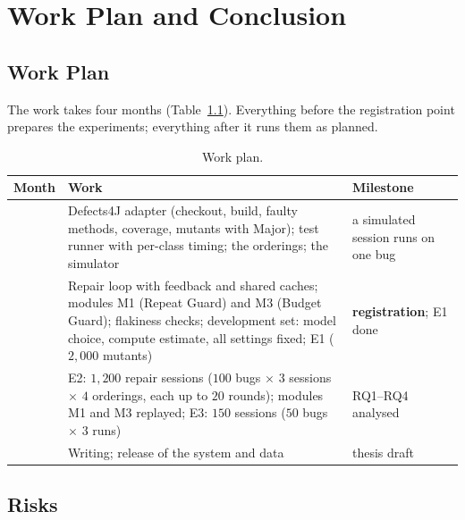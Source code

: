 \chapter{Work Plan and Conclusion}
\label{ch:plan}

\section{Work Plan}
\label{sec:plan-work}

The work takes four months (Table~\ref{tab:plan}). Everything before the
registration point prepares the experiments; everything after it runs them as
planned.

\begin{table}[htbp]
\centering
\caption{Work plan.}
\label{tab:plan}
\footnotesize
\begin{tabularx}{\textwidth}{@{}>{\raggedright\arraybackslash}p{} >{\raggedright\arraybackslash}X >{\raggedright\arraybackslash}p{}@{}}
\toprule
Month & Work & Milestone\\
\midrule
1 & Defects4J adapter (checkout, build, faulty methods, coverage, mutants with Major); test runner with per-class timing; the orderings; the simulator & a simulated session runs on one bug\\
2 & Repair loop with feedback and shared caches; modules M1 (Repeat Guard) and M3 (Budget Guard); flakiness checks; development set: model choice, compute estimate, all settings fixed; E1 ($2{,}000$ mutants) & \textbf{registration}; E1 done\\
3 & E2: $1{,}200$ repair sessions ($100$ bugs $\times$ $3$ sessions $\times$ $4$ orderings, each up to $20$ rounds); modules M1 and M3 replayed; E3: $150$ sessions ($50$ bugs $\times$ $3$ runs) & RQ1--RQ4 analysed\\
4 & Writing; release of the system and data & thesis draft\\
\bottomrule
\end{tabularx}
\end{table}

\section{Risks}
\label{sec:plan-risks}

